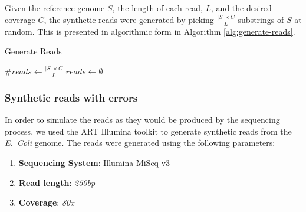 Given the reference genome $S$, the length of each read, $L$, and the desired coverage $C$, the synthetic reads were generated by picking
$\frac{|S| \times C}{L}$ substrings of $S$ at random. This is presented in algorithmic form in Algorithm \ref{alg:generate-reads}.

\begin{algorithm}
  \caption{Generate Reads}\label{alg:generate-reads}
  $\mathit{\#reads} \gets \frac{|S| \times C}{L}$\;
  $reads \gets \emptyset$\;
\end{algorithm}

\subsubsection{Synthetic reads with errors}

In order to simulate the reads as they would be produced by the sequencing process, we used the ART Illumina toolkit to generate
synthetic reads from the \emph{E.~Coli} genome. The reads were generated using the following parameters:

\begin{enumerate}
\item \textbf{Sequencing System}: Illumina MiSeq v3
\item \textbf{Read length}: \textit{250bp}
\item \textbf{Coverage}: \textit{80x}
\end{enumerate}